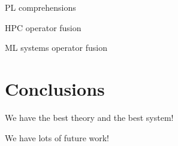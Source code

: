 \documentclass{vldb}
\begin{document}
PL comprehensions

HPC operator fusion

ML systems operator fusion

\section{Conclusions}

We have the best theory and the best system!

We have lots of future work!

\small

  
\normalsize
\end{document}
